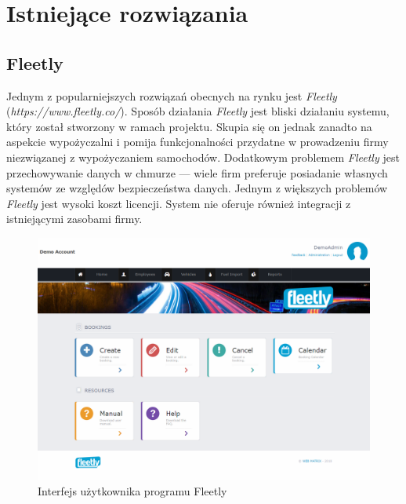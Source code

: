 \documentclass[eng,printmode,openany]{mgr}
\begin{document}
	\chapter{Istniejące rozwiązania}
	
	\section{Fleetly}
	Jednym z popularniejszych rozwiązań obecnych na rynku jest \textit{Fleetly} (\textit{https://www.fleetly.co/}). Sposób działania \textit{Fleetly} jest bliski działaniu systemu, który został stworzony w ramach projektu. Skupia się on jednak zanadto na aspekcie wypożyczalni i pomija funkcjonalności przydatne w prowadzeniu firmy niezwiązanej z wypożyczaniem samochodów. Dodatkowym problemem \textit{Fleetly} jest przechowywanie danych w chmurze — wiele firm preferuje posiadanie własnych systemów ze względów bezpieczeństwa danych. Jednym z większych problemów \textit{Fleetly} jest wysoki koszt licencji. System nie oferuje również integracji z istniejącymi zasobami firmy.
	\begin{figure}[H]
		\centering
		\includegraphics[width=\textwidth]{images/fleetly.png}
		\caption{Interfejs użytkownika programu Fleetly}
	\end{figure}
	
\end{document}
